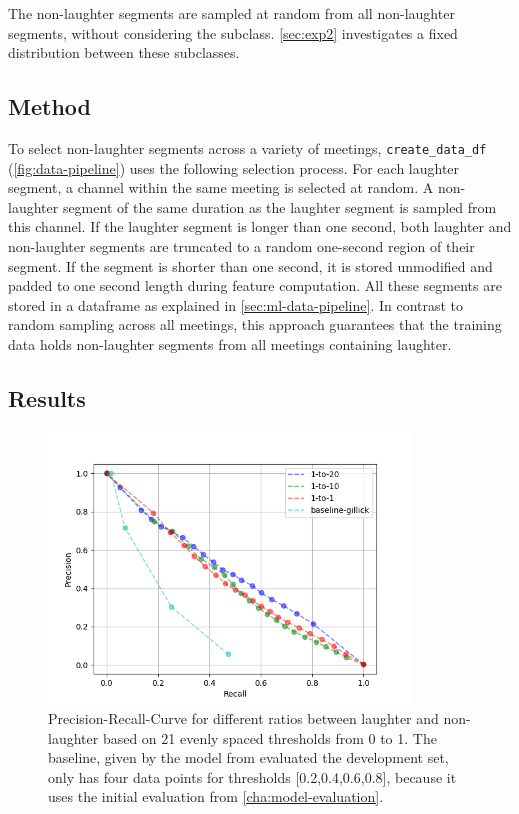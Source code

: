 \documentclass[bsc,frontabs,parskip,deptreport]{infthesis}
\begin{document}
The non-laughter segments are sampled at random from all non-laughter segments, without considering the subclass. 
\autoref{sec:exp2} investigates a fixed distribution between these subclasses. 


\subsection{Method}
To select non-laughter segments across a variety of meetings, \verb|create_data_df| (\autoref{fig:data-pipeline}) uses the following selection process.
For each laughter segment, a channel within the same meeting is selected at random.
A non-laughter segment of the same duration as the laughter segment is sampled from this channel.
If the laughter segment is longer than one second, both laughter and non-laughter segments are truncated to a random one-second region of their segment. 
If the segment is shorter than one second, it is stored unmodified and padded to one second length during feature computation.
All these segments are stored in a dataframe as explained in \autoref{sec:ml-data-pipeline}.
In contrast to random sampling across all meetings, this approach guarantees that the training data holds non-laughter segments from all meetings containing laughter. 

\subsection{Results} \label{sec:exp1-res}

\begin{figure}[h!]
    \centering
    \includegraphics[width = 3.8in]{imgs/prec-recall/exp1-random/dev_compare_class_balance_dev_set.png}
    \caption{Precision-Recall-Curve for different ratios between laughter and non-laughter based on 21 evenly spaced thresholds from 0 to 1.  The baseline, given by the model from \citet{gillick2021robust} evaluated the development set, only has four data points for thresholds [0.2,0.4,0.6,0.8], because it uses the initial evaluation from \autoref{cha:model-evaluation}.}
    \label{fig:prec-recall-rand}
\end{figure}
\end{document}
